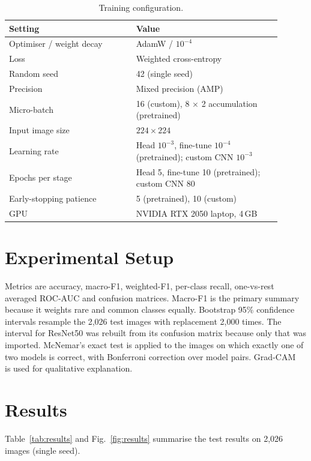 \documentclass[conference]{IEEEtran}
\begin{document}
\begin{table}[t]
\centering
\caption{Training configuration.}
\label{tab:config}
\renewcommand{\arraystretch}{1.05}
\begin{tabular}{p{0.42\linewidth}p{0.48\linewidth}}
\toprule
Setting & Value \\
\midrule
Optimiser / weight decay & AdamW / $10^{-4}$ \\
Loss & Weighted cross-entropy \\
Random seed & 42 (single seed) \\
Precision & Mixed precision (AMP) \\
Micro-batch & 16 (custom), 8 $\times$ 2 accumulation (pretrained) \\
Input image size & $224\times224$ \\
Learning rate & Head $10^{-3}$, fine-tune $10^{-4}$ (pretrained); custom CNN $10^{-3}$ \\
Epochs per stage & Head 5, fine-tune 10 (pretrained); custom CNN 80 \\
Early-stopping patience & 5 (pretrained), 10 (custom) \\
GPU & NVIDIA RTX 2050 laptop, 4\,GB \\
\bottomrule
\end{tabular}
\end{table}

\section{Experimental Setup}
Metrics are accuracy, macro-F1, weighted-F1, per-class recall, one-vs-rest averaged ROC-AUC and confusion matrices. Macro-F1 is the primary summary because it weights rare and common classes equally. Bootstrap 95\% confidence intervals resample the 2{,}026 test images with replacement 2{,}000 times. The interval for ResNet50 was rebuilt from its confusion matrix because only that was imported. McNemar's exact test is applied to the images on which exactly one of two models is correct, with Bonferroni correction over model pairs. Grad-CAM~\cite{selvaraju2017} is used for qualitative explanation.

\section{Results}
Table~\ref{tab:results} and Fig.~\ref{fig:results} summarise the test results on 2{,}026 images (single seed).
\end{document}

